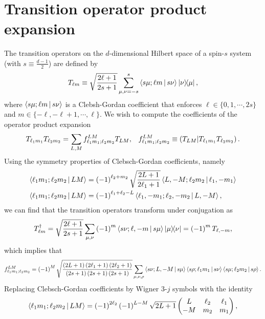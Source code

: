 \documentclass[notitlepage,twocolumn]{revtex4-2}
\newcommand{\f}[2]{\dfrac{#1}{#2}} %
\newcommand{\p}[1]{\left(#1\right)} %
\renewcommand{\set}[1]{\{#1\}} %
\newcommand{\bk}{\Braket} %
\newcommand{\1}{\mathds{1}}
\def\obk#1{\mathinner{({#1})}}
\begin{document}
\section{Transition operator product expansion}
\label{sec:trans_prod}

The transition operators on the $d$-dimensional Hilbert space of a spin-$s$ system (with $s\equiv\frac{d-1}{2}$) are defined by
\begin{align}
  T_{\ell m} \equiv \sqrt{\f{2\ell+1}{2s+1}} \sum_{\mu,\nu=-s}^s
  \bk{s\mu;\ell m|s\nu} \op{\nu}{\mu},
\end{align}
where $\bk{s\mu;\ell m|s\nu}$ is a Clebsh-Gordan coefficient that enforces $\ell\in\set{0,1,\cdots,2s}$ and $m\in\set{-\ell,-\ell+1,\cdots,\ell}$.
We wish to compute the coefficients of the operator product expansion
\begin{align}
  T_{\ell_1 m_1} T_{\ell_2 m_2}
  = \sum_{L,M} f_{\ell_1 m_1;\ell_2 m_2}^{LM} T_{LM},
  &&
  f_{\ell_1 m_1;\ell_2 m_2}^{LM}
  \equiv \obk{T_{LM} | T_{\ell_1 m_1} T_{\ell_2 m_2}}.
\end{align}
Using the symmetry properties of Clebsch-Gordan coefficients, namely
\begin{align}
  \bk{\ell_1 m_1; \ell_2 m_2| L M}
  &= \p{-1}^{\ell_2+m_2} \sqrt{\f{2L+1}{2\ell_1+1}}
  \bk{L,-M; \ell_2 m_2| \ell_1,-m_1} \\
  \bk{\ell_1 m_1; \ell_2 m_2| L M}
  &= \p{-1}^{\ell_1+\ell_2-L}
  \bk{\ell_1,-m_1; \ell_2,-m_2| L,-M},
\end{align}
we can find that the transition operators transform under conjugation as
\begin{align}
  T_{\ell m}^\dag
  = \sqrt{\f{2\ell+1}{2s+1}}
  \sum_{\mu,\nu} \p{-1}^m \bk{s\nu;\ell,-m|s\mu} \op{\mu}{\nu}
  = \p{-1}^m T_{\ell,-m},
\end{align}
which implies that
\begin{align}
  f_{\ell_1 m_1;\ell_2 m_2}^{LM}
  = \p{-1}^M \sqrt{\f{\p{2L+1}\p{2\ell_1+1}\p{2\ell_2+1}}
    {\p{2s+1}\p{2s+1}\p{2s+1}}}
  \sum_{\mu,\nu,\rho} \bk{s\nu;L,-M|s\mu}
  \bk{s\rho;\ell_1m_1|s\nu} \bk{s\mu;\ell_2m_2|s\rho}.
\end{align}
Replacing Clebsch-Gordan coefficients by Wigner 3-$j$ symbols with the identity
\begin{align}
  \bk{\ell_1 m_1; \ell_2 m_2| L M}
  = \p{-1}^{2\ell_2} \p{-1}^{L-M} \sqrt{2L+1}
  \begin{pmatrix}
    L & \ell_2 & \ell_1 \\
    -M & m_2 & m_1
  \end{pmatrix},
\end{align}
\end{document}
